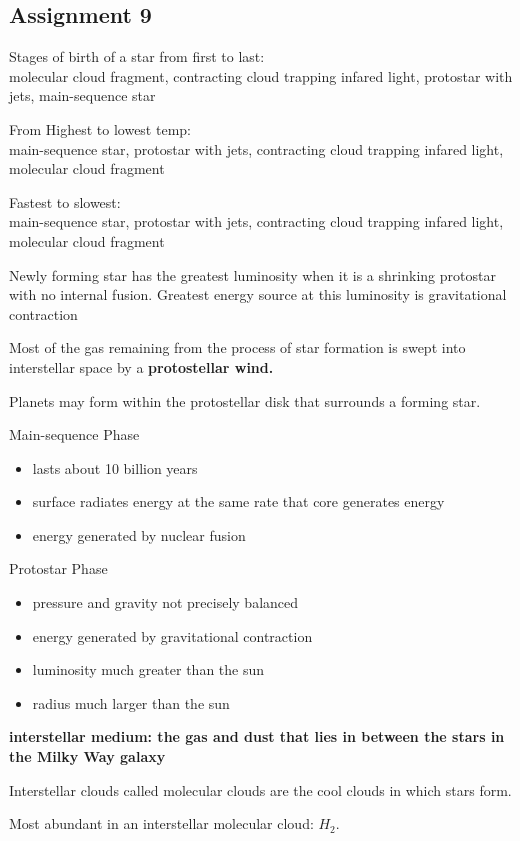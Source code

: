 \subsection{Assignment 9}
Stages of birth of a star from first to last:\\
molecular cloud fragment, contracting cloud trapping infared light, protostar with jets, main-sequence star

From Highest to lowest temp:\\
main-sequence star, protostar with jets, contracting cloud trapping infared light, molecular cloud fragment

Fastest to slowest:\\
main-sequence star, protostar with jets, contracting cloud trapping infared light, molecular cloud fragment

Newly forming star has the greatest luminosity when it is a shrinking protostar with no internal fusion. Greatest energy source at this luminosity is gravitational contraction

Most of the gas remaining from the process of star formation is swept into interstellar space by a \bf{protostellar wind}.

Planets may form within the protostellar disk that surrounds a forming star.

Main-sequence Phase
\begin{itemize}
\item lasts about 10 billion years
\item surface radiates energy at the same rate that core generates energy
\item energy generated by nuclear fusion
\end{itemize}

Protostar Phase
\begin{itemize}
\item pressure and gravity not precisely balanced
\item energy generated by gravitational contraction
\item luminosity much greater than the sun
\item radius much larger than the sun
\end{itemize}

\bf{interstellar medium}: the gas and dust that lies in between the stars in the Milky Way galaxy

Interstellar clouds called molecular clouds are the cool clouds in which stars form.

Most abundant in an interstellar molecular cloud: $H_2$.

